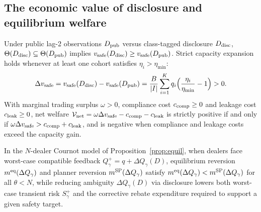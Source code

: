 \subsection{The economic value of disclosure and equilibrium welfare}
\begin{theorem}\label{thm:flagship_F}
Under public lag-2 observations $D_{\rm pub}$ versus class-tagged disclosure $D_{\rm disc}$, $\Theta(D_{\rm disc})\subseteq\Theta(D_{\rm pub})$ implies $v_{\rm safe}(D_{\rm disc})\ge v_{\rm safe}(D_{\rm pub})$. Strict capacity expansion holds whenever at least one cohort satisfies $\eta_i>\eta_{\min}$:
\[
\Delta v_{\rm safe}=v_{\rm safe}(D_{\rm disc})-v_{\rm safe}(D_{\rm pub})=\frac{B}{|I|}\sum_{i=1}^K q_i\Bigl(\frac{\eta_i}{\eta_{\min}}-1\Bigr)>0.
\]
With marginal trading surplus $\omega>0$, compliance cost $c_{\rm comp}\ge 0$ and leakage cost $c_{\rm leak}\ge 0$, net welfare $\mathcal V_{\rm net}=\omega\Delta v_{\rm safe}-c_{\rm comp}-c_{\rm leak}$ is strictly positive if and only if $\omega\Delta v_{\rm safe}>c_{\rm comp}+c_{\rm leak}$, and is negative when compliance and leakage costs exceed the capacity gain.
\end{theorem}

\begin{theorem}\label{thm:flagship_G}
In the $N$-dealer Cournot model of Proposition~\ref{prop:equil}, when dealers face worst-case compatible feedback $Q^+_\gamma=q+\Delta Q_\gamma(D)$, equilibrium reversion $m^{\rm eq}(\Delta Q_\gamma)$ and planner reversion $m^{\rm SP}(\Delta Q_\gamma)$ satisfy $m^{\rm eq}(\Delta Q_\gamma)<m^{\rm SP}(\Delta Q_\gamma)$ for all $\theta<N$, while reducing ambiguity $\Delta Q_\gamma(D)$ via disclosure lowers both worst-case transient risk $S^+_\gamma$ and the corrective rebate expenditure required to support a given safety target.
\end{theorem}

